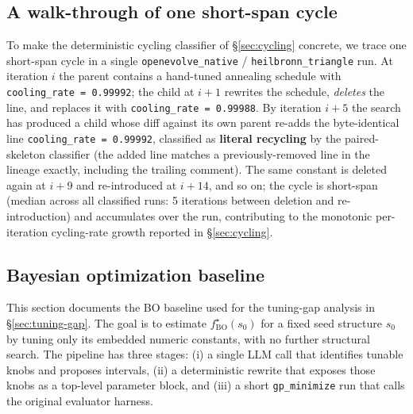 \subsection{A walk-through of one short-span cycle}
\label{appendix:cycling-example}

To make the deterministic cycling classifier of \S\ref{sec:cycling} concrete, we trace one short-span cycle in a single \texttt{openevolve\_native} / \texttt{heilbronn\_triangle} run. At iteration $i$ the parent contains a hand-tuned annealing schedule with \texttt{cooling\_rate = 0.99992}; the child at $i{+}1$ rewrites the schedule, \emph{deletes} the line, and replaces it with \texttt{cooling\_rate = 0.99988}. By iteration $i{+}5$ the search has produced a child whose diff against its own parent re-adds the byte-identical line \texttt{cooling\_rate = 0.99992}, classified as \textbf{literal recycling} by the paired-skeleton classifier (the added line matches a previously-removed line in the lineage exactly, including the trailing comment). The same constant is deleted again at $i{+}9$ and re-introduced at $i{+}14$, and so on; the cycle is short-span (median across all classified runs: 5 iterations between deletion and re-introduction) and accumulates over the run, contributing to the monotonic per-iteration cycling-rate growth reported in \S\ref{sec:cycling}.

\subsection{Bayesian optimization baseline}
\label{appendix:bo-details}

This section documents the BO baseline used for the tuning-gap analysis in \S\ref{sec:tuning-gap}. The goal is to estimate $f^{\star}_{\mathrm{BO}}(s_0)$ for a fixed seed structure $s_0$ by tuning only its embedded numeric constants, with no further structural search. The pipeline has three stages: (i) a single LLM call that identifies tunable knobs and proposes intervals, (ii) a deterministic rewrite that exposes those knobs as a top-level parameter block, and (iii) a short \texttt{gp\_minimize} run that calls the original evaluator harness.

